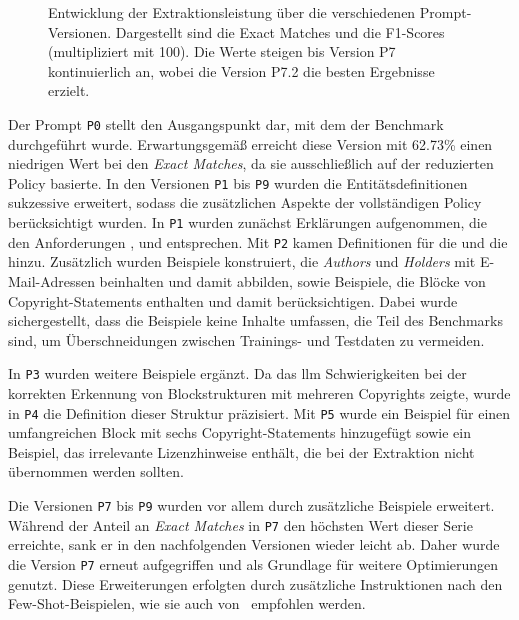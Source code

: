 \begin{figure}[ht]
    \centering
    \caption{Entwicklung der Extraktionsleistung über die verschiedenen Prompt-Versionen. Dargestellt sind die Exact Matches und die F1-Scores (multipliziert mit 100). Die Werte steigen bis Version P7 kontinuierlich an, wobei die Version P7.2 die besten Ergebnisse erzielt.}
    \label{fig:prompt-engineering-results}
\end{figure}

Der Prompt \texttt{P0} stellt den Ausgangspunkt dar, mit dem der Benchmark durchgeführt wurde.
Erwartungsgemäß erreicht diese Version mit \num{62.73}\% einen niedrigen Wert bei den \textit{Exact Matches}, da sie ausschließlich auf der reduzierten Policy basierte.
In den Versionen \texttt{P1} bis \texttt{P9} wurden die Entitätsdefinitionen sukzessive erweitert, sodass die zusätzlichen Aspekte der vollständigen Policy berücksichtigt wurden.
In \texttt{P1} wurden zunächst Erklärungen aufgenommen, die den Anforderungen ,  und  entsprechen.
Mit \texttt{P2} kamen Definitionen für die  und die  hinzu.
Zusätzlich wurden Beispiele konstruiert, die \textit{Authors} und \textit{Holders} mit E-Mail-Adressen beinhalten und damit  abbilden, sowie Beispiele, die Blöcke von Copyright-Statements enthalten und damit  berücksichtigen.
Dabei wurde sichergestellt, dass die Beispiele keine Inhalte umfassen, die Teil des Benchmarks sind, um Überschneidungen zwischen Trainings- und Testdaten zu vermeiden.

In \texttt{P3} wurden weitere Beispiele ergänzt.
Da das \gls{llm} Schwierigkeiten bei der korrekten Erkennung von Blockstrukturen mit mehreren Copyrights zeigte, wurde in \texttt{P4} die Definition dieser Struktur präzisiert.
Mit \texttt{P5} wurde ein Beispiel für einen umfangreichen Block mit sechs Copyright-Statements hinzugefügt sowie ein Beispiel, das irrelevante Lizenzhinweise enthält, die bei der Extraktion nicht übernommen werden sollten.

Die Versionen \texttt{P7} bis \texttt{P9} wurden vor allem durch zusätzliche Beispiele erweitert.
Während der Anteil an \textit{Exact Matches} in \texttt{P7} den höchsten Wert dieser Serie erreichte, sank er in den nachfolgenden Versionen wieder leicht ab.
Daher wurde die Version \texttt{P7} erneut aufgegriffen und als Grundlage für weitere Optimierungen genutzt.
Diese Erweiterungen erfolgten durch zusätzliche Instruktionen nach den Few-Shot-Beispielen, wie sie auch von \citeauthor{cheng_novel_2024}\ empfohlen werden\autocite{cheng_novel_2024}.

